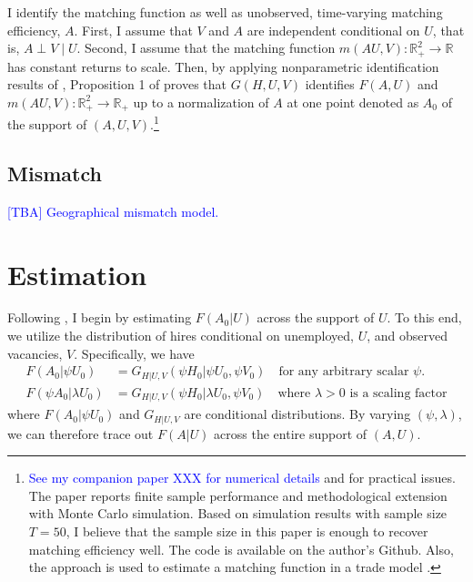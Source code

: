 \documentclass[12pt]{article}
\begin{document}
I identify the matching function as well as unobserved, time-varying matching efficiency, $A .$ 
First, I assume that $V$ and $A$ are independent conditional on $U$, that is, $A \perp V \mid U$. 
Second, I assume that the matching function $m(AU,V):\mathbb{R}_{+}^2 \rightarrow \mathbb{R}$ has constant returns to scale. 
Then, by applying nonparametric identification results of \cite{matzkin2003nonparametric}, Proposition 1 of \cite{lange2020beyond} proves that $G(H, U, V)$ identifies $F(A, U)$ and $m(A U, V): \mathbb{R}_{+}^2 \rightarrow \mathbb{R}_{+}$ up to a normalization of $A$ at one point denoted as $A_0$ of the support of $(A, U, V)$.\footnote{\textcolor{blue}{See my companion paper XXX for numerical details} and \cite{brancaccio2020guide} for practical issues. The paper reports finite sample performance and methodological extension with Monte Carlo simulation. Based on simulation results with sample size $T=50$, I believe that the sample size in this paper is enough to recover matching efficiency well. The code is available on the author's Github. Also, the approach is used to estimate a matching function in a trade model \citep{brancaccio2020geography,brancaccio2023search}.}

\subsection{Mismatch}
\textcolor{blue}{[TBA] Geographical mismatch model.} 

\section{Estimation}
Following \cite{lange2020beyond}, I begin by estimating $F(A_0|U)$ across the support of $U$. To this end, we utilize the distribution of hires conditional on unemployed, $U$, and observed vacancies, $V$. 
Specifically, we have
\begin{align*}
    F(A_0|\psi U_0) &= G_{H|U,V}(\psi H_0|\psi U_0, \psi V_0) \quad \text{for any arbitrary scalar } \psi.\\
    F(\psi A_0|\lambda U_0) &= G_{H|U,V}(\psi H_0|\lambda U_0, \psi V_0) \quad \text{where } \lambda > 0 \text{ is a scaling factor}
\end{align*}
where $F(A_0|\psi U_0)$ and $ G_{H|U,V}$ are conditional distributions.
By varying $(\psi, \lambda)$, we can therefore trace out $F(A|U)$ across the entire support of $(A, U)$.
\end{document}
